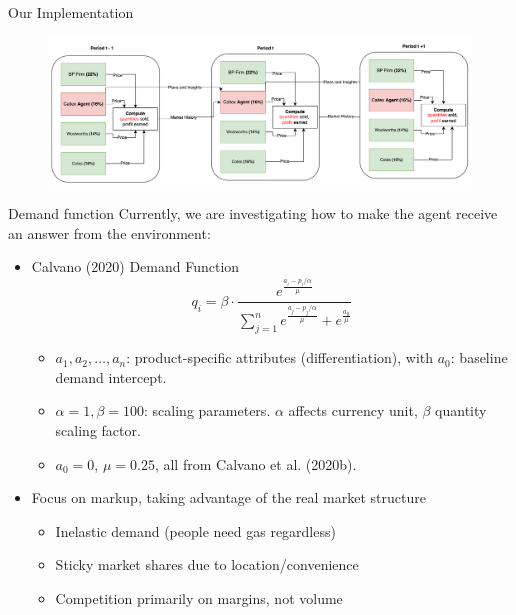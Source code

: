 \documentclass[10pt]{beamer}
\begin{document}
\subsection{}

\begin{frame}[fragile]{Our Implementation}
\begin{figure}
    \centering
    \includegraphics[width=1.5\linewidth]{slides_pricing_collusion/imgs/diagram.png}
    \caption{}
    \label{fig:enter-label}
\end{figure}
  
\end{frame}

\begin{frame}[fragile]{Demand function}
Currently, we are investigating how to make the agent receive an answer from the environment:
\begin{itemize}
    \item Calvano (2020) Demand Function
    $$
q_i = \beta \cdot \frac{e^{\frac{a_i - p_i/\alpha}{\mu}}}{\sum_{j=1}^{n} e^{\frac{a_j - p_j/\alpha}{\mu}} + e^{\frac{a_0}{\mu}}}
$$
\begin{itemize}
    \item $a_1, a_2, \ldots, a_n$: product-specific attributes (differentiation), with $a_0$: baseline demand intercept.
    \item $\alpha=1, \beta=100$: scaling parameters. $\alpha$ affects currency unit, $\beta$ quantity scaling factor.
    \item $a_0 = 0$, $\mu = 0.25$, all from Calvano et al. (2020b).
\end{itemize}
    \item Focus on markup, taking advantage of the real market structure
    \begin{itemize}
        \item ⁠Inelastic demand (people need gas regardless)
        \item Sticky market shares due to location/convenience
        \item Competition primarily on margins, not volume
    \end{itemize}
\end{itemize}
  
\end{frame}






%  
%  

\end{document}

